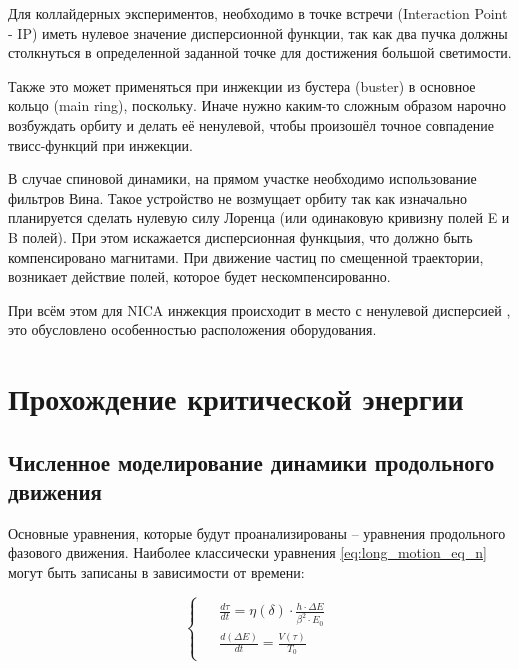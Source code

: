 \par Для коллайдерных экспериментов, необходимо в точке встречи (Interaction Point - IP) иметь нулевое значение дисперсионной функции, так как два пучка должны столкнуться в определенной заданной точке для достижения большой светимости.

\par Также это может применяться при инжекции из бустера (buster) в основное кольцо (main ring), поскольку. Иначе нужно каким-то сложным образом нарочно возбуждать орбиту и делать её ненулевой, чтобы произошёл точное совпадение твисс-функций при инжекции. 

\par В случае спиновой динамики, на прямом участке необходимо использование фильтров Вина. Такое устройство не возмущает орбиту так как изначально планируется сделать нулевую силу Лоренца (или одинаковую кривизну полей E и B полей). При этом искажается дисперсионная функцыия, что должно быть компенсировано магнитами. При движение частиц по смещенной траектории, возникает  действие полей, которое будет нескомпенсированно.

\par При всём этом для NICA инжекция происходит в место с ненулевой дисперсией , это обусловлено особенностью расположения оборудования.
	
	\section{Прохождение критической энергии}\label{sec:transition_jump/U-70}
	
	\subsection{Численное моделирование динамики продольного движения} \label{sec:transition_jump/modeling}
	
\par Основные уравнения, которые будут проанализированы – уравнения продольного фазового движения.
Наиболее классически уравнения \ref{eq:long_motion_eq_n} могут быть записаны в зависимости от времени:
	
\begin{equation}
\begin{cases}
\begin{aligned}
& \frac{d \tau}{d t}=\eta(\delta) \cdot \frac{h \cdot \Delta E}{\beta^2 \cdot E_0} \\
& \frac{d(\Delta E)}{d t}=\frac{V(\tau)}{T_0}
\end{aligned}
\end{cases}
\label{eq:long_motion_eq_t}
\end{equation}	

